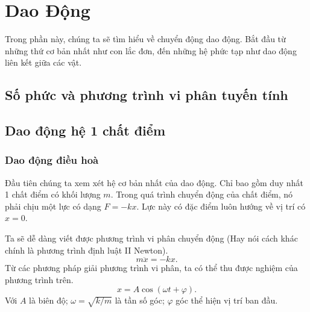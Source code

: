   
\chapter{Dao Động}

Trong phần này, chúng ta sẽ tìm hiểu về chuyển động dao động. Bắt đầu từ những thứ cơ bản nhất như con lắc đơn, đến những hệ phức tạp như dao động liên kết giữa các vật. 


\section{Số phức và phương trình vi phân tuyến tính}

\section{Dao động hệ 1 chất điểm}
\subsection{Dao động điều hoà}
Đầu tiên chúng ta xem xét hệ cơ bản nhất của dao động. Chỉ bao gồm duy nhất 1 chất điểm có khối lượng \(m\). Trong quá trình chuyển động của chất điểm, nó phải chịu một lực có dạng \(F = - k x\). Lực này có đặc điểm luôn hướng về vị trí có \(x = 0\). 

\begin{figure}[!htb]
    \centering
    
    \caption{}
    \label{fig:1.1}
\end{figure}

Ta sẽ dễ dàng viết được phương trình vi phân chuyển động (Hay nói cách khác chính là phương trình định luật II Newton).
\begin{equation}
    m \ddot{x} = -kx.
    \label{eq:1.1}
\end{equation}
Từ các phương pháp giải phương trình vi phân, ta có thể thu được nghiệm của phương trình trên.
\begin{equation}
    x = A \cos{ \left(\omega t + \varphi \right)}.
    \label{eq:1.2}
\end{equation}
Với \(A\) là biên độ; \(\omega = \sqrt{k/m}\) là tần số góc; \(\varphi\) góc thể hiện vị trí ban đầu. 
\vspace{4mm}

